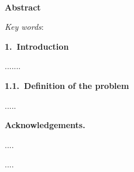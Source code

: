 \documentclass[11pt,leqno]{book}
\def\bibname{{\Large\bf References}} %
\newcommand{\sect}[1]{\vskip7mm\par{\large \bf #1}}
\newcommand{\subsect}[1]{\vskip 3mm\par{\bf#1}}
\begin{document}
\begin{center}
\textbf{\LARGE
\\}

\vspace*{5mm}


\end{center}



\sect{Abstract}
	

\textit{Key words}: %


\sect{1.~Introduction}

.......


\subsect{1.1.~Definition of the problem}

.....



\sect{Acknowledgements.} %



\def\bibname{{\Large\bf References}}
\begin{thebibliography}{99}
 ....

 ....

\end{thebibliography}
\end{document}
